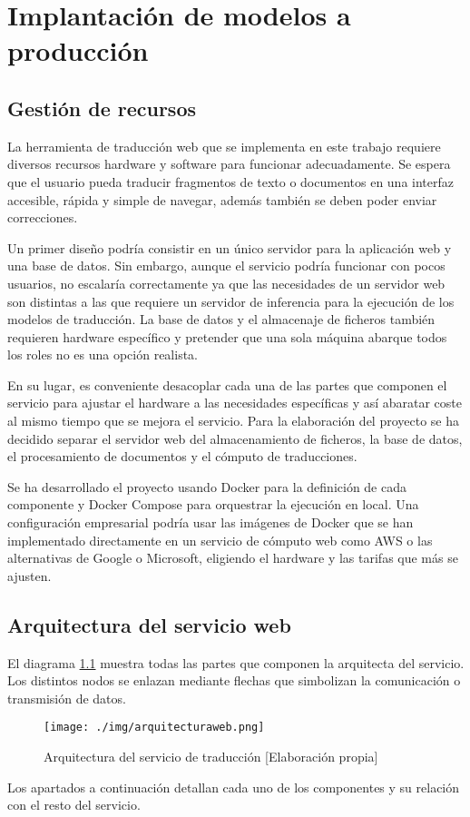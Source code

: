 \chapter{Implantación de modelos a producción}\label{deployprod}
\section{Gestión de recursos}
La herramienta de traducción web que se implementa en este trabajo requiere diversos recursos hardware y software para funcionar adecuadamente. Se espera que el usuario pueda traducir fragmentos de texto o documentos en una interfaz accesible, rápida y simple de navegar, además también se deben poder enviar correcciones.

Un primer diseño podría consistir en un único servidor para la aplicación web y una base de datos. Sin embargo, aunque el servicio podría funcionar con pocos usuarios, no escalaría correctamente ya que las necesidades de un servidor web son distintas a las que requiere un servidor de inferencia para la ejecución de los modelos de traducción. La base de datos y el almacenaje de ficheros también requieren hardware específico y pretender que una sola máquina abarque todos los roles no es una opción realista.

En su lugar, es conveniente desacoplar cada una de las partes que componen el servicio para ajustar el hardware a las necesidades específicas y así abaratar coste al mismo tiempo que se mejora el servicio. Para la elaboración del proyecto se ha decidido separar el servidor web del almacenamiento de ficheros, la base de datos, el procesamiento de documentos y el cómputo de traducciones.

Se ha desarrollado el proyecto usando Docker para la definición de cada componente y Docker Compose para orquestrar la ejecución en local. Una configuración empresarial podría usar las imágenes de Docker que se han implementado directamente en un servicio de cómputo web como AWS o las alternativas de Google o Microsoft, eligiendo el hardware y las tarifas que más se ajusten.

\section{Arquitectura del servicio web}
El diagrama \ref{webdiagram} muestra todas las partes que componen la arquitecta del servicio. Los distintos nodos se enlazan mediante flechas que simbolizan la comunicación o transmisión de datos.
\begin{figure}[H]
    \centering
    \texttt{[image: ./img/arquitecturaweb.png]}
    \caption{Arquitectura del servicio de traducción [Elaboración propia]}\label{webdiagram}
\end{figure}
Los apartados a continuación detallan cada uno de los componentes y su relación con el resto del servicio.

